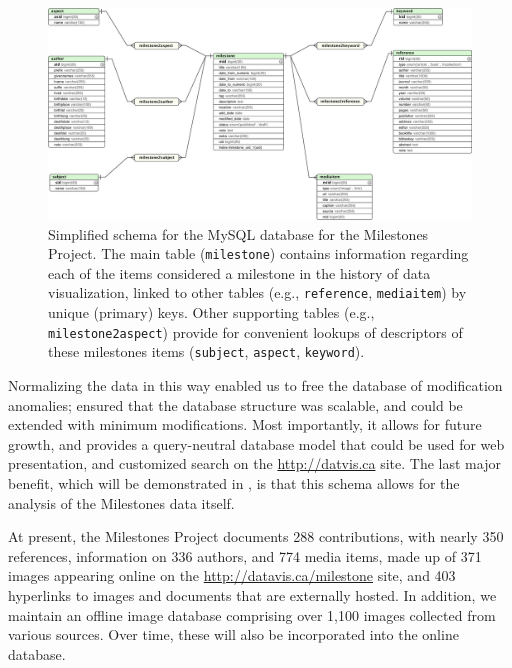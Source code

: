 \begin{figure}[!htb]
  \centering
  \includegraphics[width=\textwidth,clip]{fig/datavis-schema-2}
  \caption{Simplified schema for the MySQL database for the Milestones Project. The main 
  table (\texttt{milestone}) contains information regarding each of the items considered a milestone in the history of data visualization, linked to other tables (e.g., \texttt{reference}, \texttt{mediaitem}) by unique (primary) keys. Other supporting tables (e.g., \texttt{milestone2aspect}) provide for convenient lookups of descriptors of these milestones items (\texttt{subject}, \texttt{aspect}, \texttt{keyword}).
  }
  \label{fig:datavis-schema-2}
\end{figure}

Normalizing the data in this way enabled us to free the database of modification anomalies; ensured that the database structure was scalable, and could be extended with minimum modifications. Most importantly, it allows for future growth, and provides a query-neutral database model \citep{Codd:1971} that could be used for web presentation, and customized search on the \url{http://datvis.ca} site. The last major benefit, which will be demonstrated in , is that this schema allows for the analysis of the Milestones data itself.

At present, the Milestones Project documents 288 contributions, with nearly 350 references, information on 336 authors, and 774 media items, made up of 371 images appearing online on the \url{http://datavis.ca/milestone} site, and 403 hyperlinks to images and documents that are externally hosted. In addition, we maintain an offline image database comprising over 1,100 images collected from various sources. Over time, these will also be incorporated into the online database.

